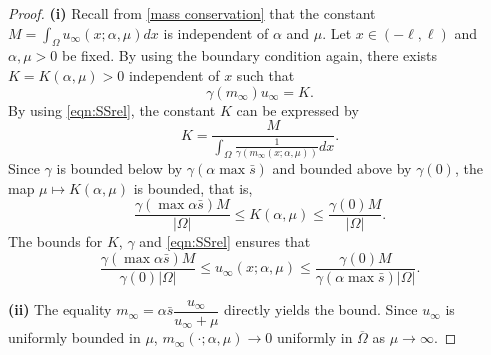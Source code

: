 \documentclass[10pt,a4paper]{amsart}
\begin{document}
\begin{proof}
\textbf{(i)} 
Recall from \eqref{mass conservation} that the constant $M=\int_\Omega u_\infty(x;\alpha,\mu)dx$ is independent of $\alpha$ and $\mu$. Let $x\in(-\ell,\ell)$ and $\alpha,\mu>0$ be fixed. 
By using the boundary condition again, there exists $K=K(\alpha,\mu)>0$ independent of $x$ such that \begin{equation}\label{eqn:SSrel}
     \gamma(m_\infty)u_\infty=K.
 \end{equation} 
   By using \eqref{eqn:SSrel}, the constant $K$ can be expressed by
\[K = \frac{M}{\int_\Omega\frac{1}{\gamma(m_\infty(x;\alpha,\mu))}dx}.\] Since $\gamma$ is bounded below by $\gamma(\alpha\max  \bar s)$ and bounded above by $\gamma(0)$, the map $\mu\mapsto K(\alpha,\mu)$ is bounded, that is, \[ \frac{\gamma(\max{\alpha \bar s}) M}{|\Omega|}\le K(\alpha,\mu)\le \frac{\gamma(0) M}{|\Omega|}.\] The bounds for $K$, $\gamma$ and \eqref{eqn:SSrel} ensures that
\[\frac{\gamma(\max{\alpha \bar s}) M}{\gamma(0)|\Omega|}\le u_\infty(x;\alpha,\mu)\le \frac{\gamma(0) M}{\gamma(\alpha \max{\bar s})|\Omega|}. \]

 
\textbf{(ii)} The equality $m_\infty = \alpha\bar s\dfrac{u_\infty}{u_\infty +\mu}$ directly yields the bound. Since $u_\infty$ is uniformly bounded in $\mu$, $m_\infty(\cdot;\alpha,\mu) \to 0$ uniformly in $\overline{\Omega}$ as $\mu\to \infty$.



\end{proof}
\end{document}
